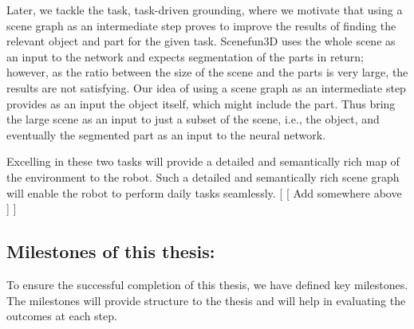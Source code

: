       Later, we tackle the task, task-driven grounding, where we motivate that using a scene graph as an intermediate step proves to 
       improve the results of finding the relevant object and part for the given task. Scenefun3D uses the whole scene as an input to the network 
       and expects segmentation of the parts in return; however, as the ratio between the size of the scene and the parts is very large, 
       the results are not satisfying. Our idea of using a scene graph as an intermediate step provides as an input the object itself, 
       which might include the part. Thus bring the large scene as an input to just a subset of the scene, i.e., the object,
        and eventually the segmented part as an input to the neural network. 
    
        Excelling in these two tasks will provide a detailed and
         semantically rich map of the environment to the robot. Such a detailed and semantically rich scene graph will enable the robot to perform daily tasks seamlessly.
[
    [
        Add somewhere above
    ]
]
\subsection{Milestones of this thesis:}
To ensure the successful completion of this thesis, we have defined key milestones. 
The milestones will provide structure to the thesis and will help in evaluating the outcomes at each step.

